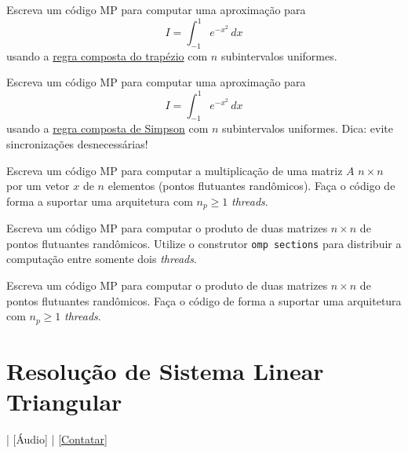 \begin{exer}\label{exer:cc_trap}
  Escreva um código MP para computar uma aproximação para
  \begin{equation}
    I = \int_{-1}^{1} e^{-x^2}\,dx
  \end{equation}
  usando a \href{https://phkonzen.github.io/notas/MatematicaNumerica/cap_integr_sec_int_comp.html}{regra composta do trapézio} com $n$ subintervalos uniformes.
\end{exer}

\begin{exer}\label{exer:cc_simp}
  Escreva um código MP para computar uma aproximação para
  \begin{equation}
    I = \int_{-1}^{1} e^{-x^2}\,dx
  \end{equation}
  usando a \href{https://phkonzen.github.io/notas/MatematicaNumerica/cap_integr_sec_int_comp.html}{regra composta de Simpson} com $n$ subintervalos uniformes. Dica: evite sincronizações desnecessárias!
\end{exer}

\begin{exer}\label{exer:cc_Ax}
  Escreva um código MP para computar a multiplicação de uma matriz $A$ $n\times n$ por um vetor $x$ de $n$ elementos (pontos flutuantes randômicos). Faça o código de forma a suportar uma arquitetura com $n_p \geq 1$ {\it threads}. 
\end{exer}

\begin{exer}
  Escreva um código MP para computar o produto de duas matrizes $n\times n$ de pontos flutuantes randômicos. Utilize o construtor \verb+omp sections+ para distribuir a computação entre somente dois {\it threads}. 
\end{exer}

\begin{exer}
  Escreva um código MP para computar o produto de duas matrizes $n\times n$ de pontos flutuantes randômicos. Faça o código de forma a suportar uma arquitetura com $n_p \geq 1$ {\it threads}.
\end{exer}

\section{Resolução de Sistema Linear Triangular}\label{cap_mp_sec_sistria}

\begin{flushright}
  [Vídeo] | [Áudio] | \href{https://phkonzen.github.io/notas/contato.html}{[Contatar]}
\end{flushright}

